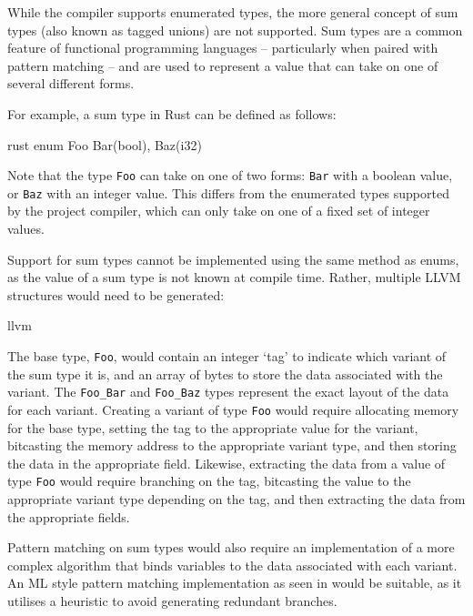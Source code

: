While the compiler supports enumerated types, the more general concept of sum types (also known as
tagged unions) are not supported. Sum types are a common feature of functional programming languages
-- particularly when paired with pattern matching -- and are used to represent a value that can take
on one of several different forms.

For example, a sum type in Rust can be defined as follows:

\begin{code}{rust}
    enum Foo {
        Bar(bool),
        Baz(i32)
    }
\end{code}

Note that the type \texttt{Foo} can take on one of two forms: \texttt{Bar} with a boolean value, or
\texttt{Baz} with an integer value. This differs from the enumerated types supported by the project
compiler, which can only take on one of a fixed set of integer values.

Support for sum types cannot be implemented using the same method as enums, as the value of a sum
type is not known at compile time. Rather, multiple LLVM structures would need to be generated:

\begin{code}{llvm}
\end{code}

The base type, \texttt{Foo}, would contain an integer `tag' to indicate which variant of the sum
type it is, and an array of bytes to store the data associated with the variant. The
\texttt{Foo_Bar} and \texttt{Foo_Baz} types represent the exact layout of the data for each variant.
Creating a variant of type \texttt{Foo} would require allocating memory for the base type, setting
the tag to the appropriate value for the variant, bitcasting the memory address to the appropriate
variant type, and then storing the data in the appropriate field. Likewise, extracting the data from
a value of type \texttt{Foo} would require branching on the tag, bitcasting the value to the
appropriate variant type depending on the tag, and then extracting the data from the appropriate
fields.

Pattern matching on sum types would also require an implementation of a more complex algorithm that
binds variables to the data associated with each variant. An ML style pattern matching
implementation as seen in \autocite{jacobs2021pattern} would be suitable, as it utilises a heuristic
to avoid generating redundant branches.

